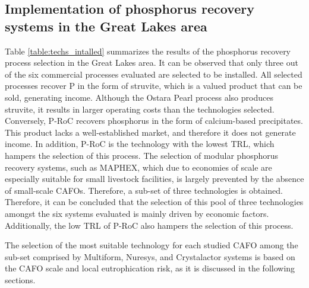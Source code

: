 \begin{refsection}[referencesCh4]
\subsection{Implementation of phosphorus recovery systems in the Great Lakes area}
Table \ref{table:techs_intalled} summarizes the results of the phosphorus recovery process selection in the Great Lakes area.
It can be observed that only three out of the six commercial processes evaluated are selected to be installed. All selected processes recover P in the form of struvite, which is a valued product that can be sold, generating income. Although the Ostara Pearl process also produces struvite, it results in larger operating costs than the technologies selected. Conversely, P-RoC recovers phosphorus in the form of calcium-based precipitates. This product lacks a well-established market, and therefore it does not generate income. In addition, P-RoC is the technology with the lowest TRL, which hampers the selection of this process. The selection of modular phosphorus recovery systems, such as MAPHEX, which due to economies of scale are especially suitable for small livestock facilities, is largely prevented by the absence of small-scale CAFOs. Therefore, a sub-set of three technologies is obtained. Therefore, it can be concluded that the selection of this pool of three technologies amongst the six systems evaluated is mainly driven by economic factors. Additionally, the low TRL of P-RoC also hampers the selection of this process.

The selection of the most suitable technology for each studied CAFO among the sub-set comprised by Multiform, Nuresys, and Crystalactor systems is based on the CAFO scale and local eutrophication risk, as it is discussed in the following sections.


\end{refsection}
